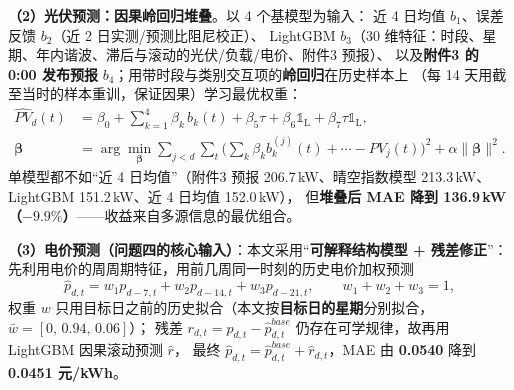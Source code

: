 \textbf{（2\nobreak）光伏预测\nobreak：因果岭回归堆叠}\nobreak。以 4 个基模型为输入\nobreak：
近 4 日均值 $b_1$\nobreak、误差反馈 $b_2$（近 2 日实测/预测比阻尼校正\nobreak）\nobreak、
LightGBM $b_3$（30 维特征\nobreak：时段\nobreak、星期\nobreak、年内谐波\nobreak、滞后与滚动的光伏/负载/电价\nobreak、附件3 预报\nobreak）\nobreak、
以及\textbf{附件3 的 0:00 发布预报} $b_4$\nobreak；用带时段与类别交互项的\textbf{岭回归}在历史样本上
（每 14 天用截至当时的样本重训\nobreak，保证因果\nobreak）学习最优权重\nobreak：
\begin{equation}
\begin{aligned}
\widehat{PV}_d(t)&=\beta_0+\sum_{k=1}^{4}\beta_k\,b_k(t)+\beta_5\tau+\beta_6\mathbb{1}_{\text{L}}
+\beta_7\tau\mathbb{1}_{\text{L}},\\
\bm\beta&=\arg\min_{\bm\beta}\sum_{j<d}\sum_t\Big(\sum_k\beta_kb_k^{(j)}(t)+\cdots-PV_j(t)\Big)^2+\alpha\|\bm\beta\|^2 .
\end{aligned}
\label{eq:basisPV}
\end{equation}
单模型都不如“近 4 日均值\nobreak”（附件3 预报 206.7\,kW\nobreak、晴空指数模型 213.3\,kW\nobreak、
LightGBM 151.2\,kW\nobreak、近 4 日均值 152.0\,kW\nobreak）\nobreak，
但\textbf{堆叠后 MAE 降到 136.9\,kW（$-9.9\%$\nobreak）}——收益来自多源信息的最优组合\nobreak。

\textbf{（3\nobreak）电价预测（问题四的核心输入\nobreak）}\nobreak：本文采用“\textbf{可解释结构模型 + 残差修正\nobreak}”\nobreak：
先利用电价的周周期特征\nobreak，用前几周同一时刻的历史电价加权预测
\begin{equation}
\hat p_{d,t}=w_1p_{d-7,t}+w_2p_{d-14,t}+w_3p_{d-21,t},\qquad w_1+w_2+w_3=1,
\label{eq:qp}
\end{equation}
权重 $w$ 只用目标日之前的历史拟合（本文按\textbf{目标日的星期}分别拟合\nobreak，$\bar w=[0,\,0.94,\,0.06]$\nobreak）\nobreak；
残差 $r_{d,t}=p_{d,t}-\hat p^{base}_{d,t}$ 仍存在可学规律\nobreak，故再用 LightGBM 因果滚动预测 $\hat r$\nobreak，
最终 $\hat p_{d,t}=\hat p^{base}_{d,t}+\hat r_{d,t}$\nobreak，MAE 由 \textbf{0.0540} 降到 \textbf{0.0451 元/kWh}\nobreak。

